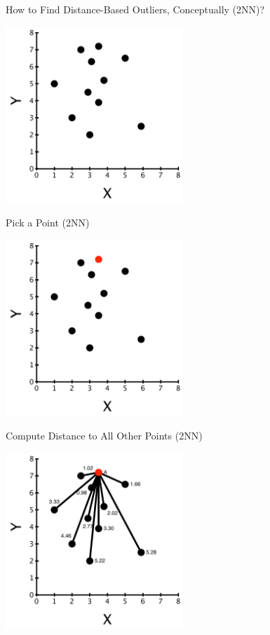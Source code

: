 \documentclass[aspectratio=169]{beamer}
\begin{document}
\begin{frame}{How to Find Distance-Based Outliers, Conceptually (2NN)?}

\includegraphics[width=0.5\textwidth]{lectOutliers/outliersPts.pdf}


\end{frame}
\begin{frame}{Pick a Point (2NN)}

\includegraphics[width=0.5\textwidth]{lectOutliers/outliersPtsA.pdf}

\end{frame}
\begin{frame}{Compute Distance to All Other Points (2NN)}

\includegraphics[width=0.5\textwidth]{lectOutliers/outliersPtsAAll.pdf}

\end{frame}
\end{document}
